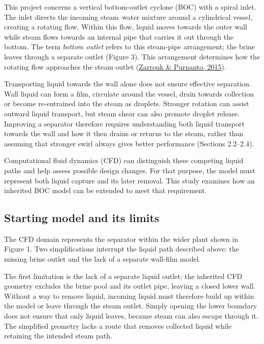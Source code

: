 \documentclass[12pt]{article}
\begin{document}
This project concerns a vertical bottom-outlet cyclone (BOC) with a spiral inlet. The inlet directs the incoming steam--water mixture around a cylindrical vessel, creating a rotating flow. Within this flow, liquid moves towards the outer wall while steam flows towards an internal pipe that carries it out through the bottom. The term \emph{bottom outlet} refers to this steam-pipe arrangement; the brine leaves through a separate outlet (Figure 3). This arrangement determines how the rotating flow approaches the steam outlet (\href{https://doi.org/10.1016/j.geothermics.2014.05.009}{Zarrouk \& Purnanto, 2015}).

Transporting liquid towards the wall alone does not ensure effective separation. Wall liquid can form a film, circulate around the vessel, drain towards collection or become re-entrained into the steam as droplets. Stronger rotation can assist outward liquid transport, but steam shear can also promote droplet release. Improving a separator therefore requires understanding both liquid transport towards the wall and how it then drains or returns to the steam, rather than assuming that stronger swirl always gives better performance (Sections 2.2--2.4).

Computational fluid dynamics (CFD) can distinguish these competing liquid paths and help assess possible design changes. For that purpose, the model must represent both liquid capture and its later removal. This study examines how an inherited BOC model can be extended to meet that requirement.

\subsection{Starting model and its limits}\label{starting-model-and-its-limits}

The CFD domain represents the separator within the wider plant shown in Figure 1. Two simplifications interrupt the liquid path described above: the missing brine outlet and the lack of a separate wall-film model.

The first limitation is the lack of a separate liquid outlet: the inherited CFD geometry excludes the brine pool and its outlet pipe, leaving a closed lower wall. Without a way to remove liquid, incoming liquid must therefore build up within the model or leave through the steam outlet. Simply opening the lower boundary does not ensure that only liquid leaves, because steam can also escape through it. The simplified geometry lacks a route that removes collected liquid while retaining the intended steam path.
\end{document}
